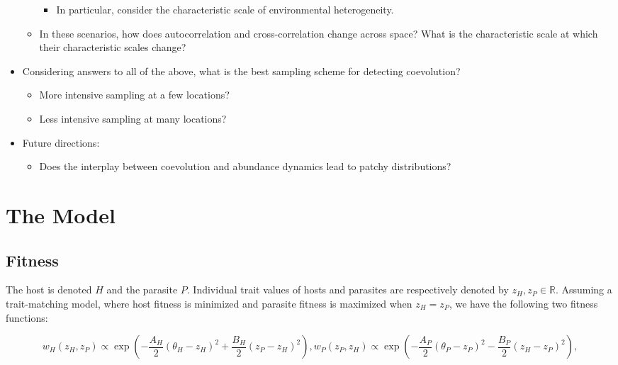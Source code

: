 \documentclass{article}
\begin{document}
\begin{itemize}
\begin{itemize}
    \begin{itemize}
    \tightlist
    \item
      In particular, consider the characteristic scale of environmental
      heterogeneity.
    \end{itemize}
  \item
    In these scenarios, how does autocorrelation and cross-correlation
    change across space? What is the characteristic scale at which their
    characteristic scales change?
  \end{itemize}
\item
  Considering answers to all of the above, what is the best sampling
  scheme for detecting coevolution?

  \begin{itemize}
  \tightlist
  \item
    More intensive sampling at a few locations?
  \item
    Less intensive sampling at many locations?
  \end{itemize}
\item
  Future directions:

  \begin{itemize}
  \tightlist
  \item
    Does the interplay between coevolution and abundance dynamics lead
    to patchy distributions?
  \end{itemize}
\end{itemize}

\hypertarget{the-model}{%
\section{The Model}\label{the-model}}

\hypertarget{fitness}{%
\subsection{Fitness}\label{fitness}}

The host is denoted \(H\) and the parasite \(P\). Individual trait
values of hosts and parasites are respectively denoted by
\(z_H,z_P\in\mathbb R\). Assuming a trait-matching model, where host
fitness is minimized and parasite fitness is maximized when \(z_H=z_P\),
we have the following two fitness functions:

\begin{subequations}\label{fit}
  \begin{equation}
    w_H(z_H,z_P)\propto \exp\left(-\frac{A_H}{2}(\theta_H-z_H)^2+\frac{B_H}{2}(z_P-z_H)^2\right),
  \end{equation}
  \begin{equation}
    w_P(z_P,z_H)\propto \exp\left(-\frac{A_P}{2}(\theta_P-z_P)^2-\frac{B_P}{2}(z_H-z_P)^2\right),
  \end{equation}
\end{subequations}
\end{document}
